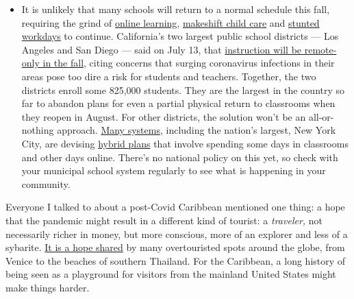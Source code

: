 \begin{itemize}
  \begin{itemize}
  \tightlist
  \item
    It is unlikely that many schools will return to a normal schedule
    this fall, requiring the grind of
    \href{https://www.nytimes3xbfgragh.onion/2020/06/05/us/coronavirus-education-lost-learning.html?action=click\&pgtype=Article\&state=default\&region=MAIN_CONTENT_3\&context=storylines_faq}{online
    learning},
    \href{https://www.nytimes3xbfgragh.onion/2020/05/29/us/coronavirus-child-care-centers.html?action=click\&pgtype=Article\&state=default\&region=MAIN_CONTENT_3\&context=storylines_faq}{makeshift
    child care} and
    \href{https://www.nytimes3xbfgragh.onion/2020/06/03/business/economy/coronavirus-working-women.html?action=click\&pgtype=Article\&state=default\&region=MAIN_CONTENT_3\&context=storylines_faq}{stunted
    workdays} to continue. California's two largest public school
    districts --- Los Angeles and San Diego --- said on July 13, that
    \href{https://www.nytimes3xbfgragh.onion/2020/07/13/us/lausd-san-diego-school-reopening.html?action=click\&pgtype=Article\&state=default\&region=MAIN_CONTENT_3\&context=storylines_faq}{instruction
    will be remote-only in the fall}, citing concerns that surging
    coronavirus infections in their areas pose too dire a risk for
    students and teachers. Together, the two districts enroll some
    825,000 students. They are the largest in the country so far to
    abandon plans for even a partial physical return to classrooms when
    they reopen in August. For other districts, the solution won't be an
    all-or-nothing approach.
    \href{https://bioethics.jhu.edu/research-and-outreach/projects/eschool-initiative/school-policy-tracker/}{Many
    systems}, including the nation's largest, New York City, are
    devising
    \href{https://www.nytimes3xbfgragh.onion/2020/06/26/us/coronavirus-schools-reopen-fall.html?action=click\&pgtype=Article\&state=default\&region=MAIN_CONTENT_3\&context=storylines_faq}{hybrid
    plans} that involve spending some days in classrooms and other days
    online. There's no national policy on this yet, so check with your
    municipal school system regularly to see what is happening in your
    community.
  \end{itemize}
\end{itemize}

Everyone I talked to about a post-Covid Caribbean mentioned one thing: a
hope that the pandemic might result in a different kind of tourist: a
\emph{traveler,} not necessarily richer in money, but more conscious,
more of an explorer and less of a sybarite.
\href{https://www.nytimes3xbfgragh.onion/2020/07/02/travel/venice-coronavirus-tourism.html}{It
is a hope shared} by many overtouristed spots around the globe, from
Venice to the beaches of southern Thailand. For the Caribbean, a long
history of being seen as a playground for visitors from the mainland
United States might make things harder.

